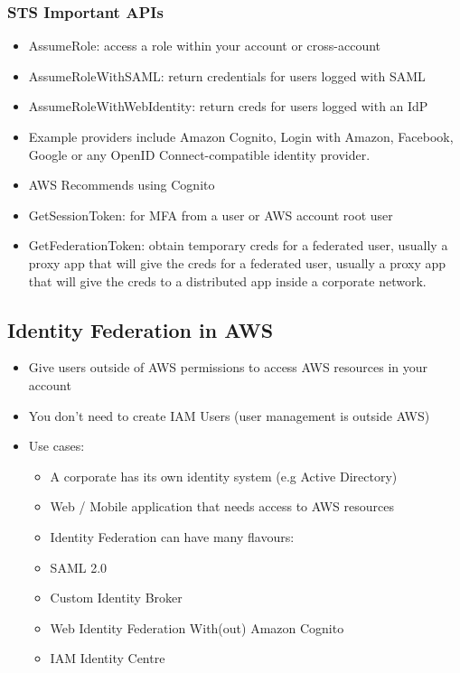 \subsubsection{STS Important APIs}
\begin{itemize}
    \item AssumeRole: access a role within your account or cross-account
    \item AssumeRoleWithSAML: return credentials for users logged with SAML
    \item AssumeRoleWithWebIdentity: return creds for users logged with an IdP
    \item Example providers include Amazon Cognito, Login with Amazon, Facebook, Google or any OpenID Connect-compatible identity provider.
    \item AWS Recommends using Cognito
    \item GetSessionToken: for MFA from a user or AWS account root user
    \item GetFederationToken: obtain temporary creds for a federated user, usually a proxy app that will give the creds for a federated user, usually a proxy app that will give the creds to a distributed app inside a corporate network.
\end{itemize}

\subsection{Identity Federation in AWS}
\begin{itemize}
    \item Give users outside of AWS permissions to access AWS resources in your account
    \item You don't need to create IAM Users (user management is outside AWS)
    \item Use cases:
    \begin{itemize}
        \item A corporate has its own identity system (e.g Active Directory)
        \item Web / Mobile application that needs access to AWS resources
        \item Identity Federation can have many flavours:
        \item SAML 2.0
        \item Custom Identity Broker
        \item Web Identity Federation With(out) Amazon Cognito
        \item IAM Identity Centre
    \end{itemize}
\end{itemize}


